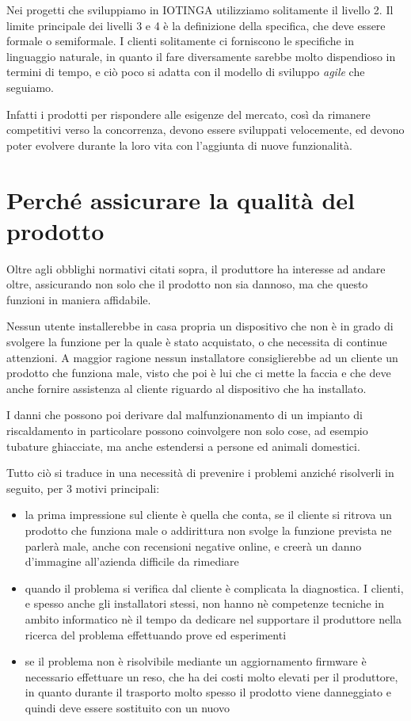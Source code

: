 \documentclass[12pt,a4paper,twoside,titlepage]{book}
\begin{document}
Nei progetti che sviluppiamo in IOTINGA utilizziamo solitamente il livello 2. 
Il limite principale dei livelli 3 e 4 è la definizione della specifica, che 
deve essere formale o semiformale. I clienti solitamente ci forniscono le specifiche in linguaggio 
naturale, in quanto il fare diversamente sarebbe molto dispendioso in termini di tempo, 
e ciò poco si adatta con il modello di sviluppo \textit{agile} che seguiamo. 

Infatti i prodotti per rispondere alle esigenze del mercato, così da rimanere 
competitivi verso la concorrenza, devono essere sviluppati velocemente, ed devono poter 
evolvere durante la loro vita con l'aggiunta di nuove funzionalità. 

\section{Perché assicurare la qualità del prodotto}

Oltre agli obblighi normativi citati sopra, il produttore ha interesse ad andare oltre, 
assicurando non solo che il prodotto non sia dannoso, ma che questo funzioni in maniera 
affidabile. 

Nessun utente installerebbe in casa propria un dispositivo che
non è in grado di svolgere la funzione per la quale è stato acquistato, 
o che necessita di continue attenzioni.
A maggior ragione nessun installatore consiglierebbe ad un cliente un prodotto che 
funziona male, visto che poi è lui che ci mette la faccia e che deve anche 
fornire assistenza al cliente riguardo al dispositivo che ha installato. 

I danni che possono poi derivare dal malfunzionamento di un impianto
di riscaldamento in particolare possono coinvolgere non solo cose, ad esempio tubature 
ghiacciate, ma anche estendersi a persone ed animali domestici.

Tutto ciò si traduce in una necessità di prevenire i problemi anziché risolverli in seguito, 
per 3 motivi principali:

\begin{itemize}
    \item la prima impressione sul cliente è quella che conta, se il cliente si ritrova
        un prodotto che funziona male o addirittura non svolge la funzione prevista ne parlerà
        male, anche con recensioni negative online, e creerà un danno d'immagine all'azienda
        difficile da rimediare
    \item quando il problema si verifica dal cliente è complicata la diagnostica. I clienti,
        e spesso anche gli installatori stessi, non hanno nè competenze tecniche in ambito informatico nè il
        tempo da dedicare nel supportare il produttore nella ricerca del problema effettuando prove ed esperimenti
    \item se il problema non è risolvibile mediante un aggiornamento \gls{firmware} è necessario
        effettuare un reso, che ha dei costi molto elevati per il produttore, in quanto
        durante il trasporto molto spesso il prodotto viene danneggiato e quindi deve
        essere sostituito con un nuovo
\end{itemize}
\end{document}
